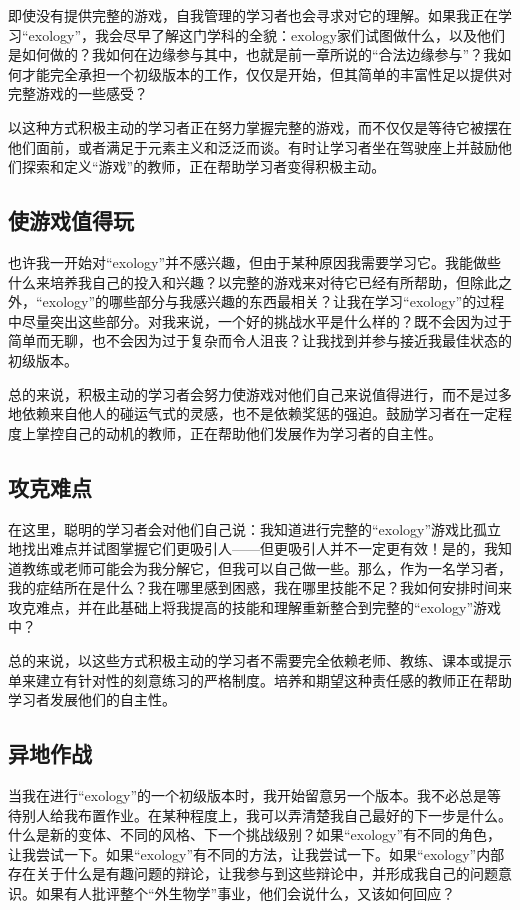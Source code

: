 即使没有提供完整的游戏，自我管理的学习者也会寻求对它的理解。如果我正在学习“exology”，我会尽早了解这门学科的全貌：exology家们试图做什么，以及他们是如何做的？我如何在边缘参与其中，也就是前一章所说的“合法边缘参与”？我如何才能完全承担一个初级版本的工作，仅仅是开始，但其简单的丰富性足以提供对完整游戏的一些感受？

以这种方式积极主动的学习者正在努力掌握完整的游戏，而不仅仅是等待它被摆在他们面前，或者满足于元素主义和泛泛而谈。有时让学习者坐在驾驶座上并鼓励他们探索和定义“游戏”的教师，正在帮助学习者变得积极主动。

\subsection*{使游戏值得玩}

也许我一开始对“exology”并不感兴趣，但由于某种原因我需要学习它。我能做些什么来培养我自己的投入和兴趣？以完整的游戏来对待它已经有所帮助，但除此之外，“exology”的哪些部分与我感兴趣的东西最相关？让我在学习“exology”的过程中尽量突出这些部分。对我来说，一个好的挑战水平是什么样的？既不会因为过于简单而无聊，也不会因为过于复杂而令人沮丧？让我找到并参与接近我最佳状态的初级版本。

总的来说，积极主动的学习者会努力使游戏对他们自己来说值得进行，而不是过多地依赖来自他人的碰运气式的灵感，也不是依赖奖惩的强迫。鼓励学习者在一定程度上掌控自己的动机的教师，正在帮助他们发展作为学习者的自主性。

\subsection*{攻克难点}

在这里，聪明的学习者会对他们自己说：我知道进行完整的“exology”游戏比孤立地找出难点并试图掌握它们更吸引人——但更吸引人并不一定更有效！是的，我知道教练或老师可能会为我分解它，但我可以自己做一些。那么，作为一名学习者，我的症结所在是什么？我在哪里感到困惑，我在哪里技能不足？我如何安排时间来攻克难点，并在此基础上将我提高的技能和理解重新整合到完整的“exology”游戏中？

总的来说，以这些方式积极主动的学习者不需要完全依赖老师、教练、课本或提示单来建立有针对性的刻意练习的严格制度。培养和期望这种责任感的教师正在帮助学习者发展他们的自主性。

\subsection*{异地作战}

当我在进行“exology”的一个初级版本时，我开始留意另一个版本。我不必总是等待别人给我布置作业。在某种程度上，我可以弄清楚我自己最好的下一步是什么。什么是新的变体、不同的风格、下一个挑战级别？如果“exology”有不同的角色，让我尝试一下。如果“exology”有不同的方法，让我尝试一下。如果“exology”内部存在关于什么是有趣问题的辩论，让我参与到这些辩论中，并形成我自己的问题意识。如果有人批评整个“外生物学”事业，他们会说什么，又该如何回应？

